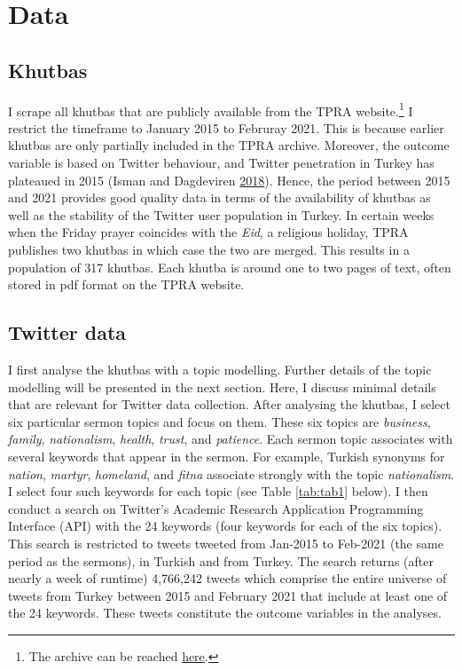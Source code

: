 \documentclass[
  12pt,
]{article}
\begin{document}
\hypertarget{data}{%
\section{Data}\label{data}}

\hypertarget{khutbas}{%
\subsection{Khutbas}\label{khutbas}}

I scrape all khutbas that are publicly available from the TPRA website.\footnote{The archive can be reached \href{https://dinhizmetleri.diyanet.gov.tr/kategoriler/yayinlarimiz/hutbeler/hutbe-ar\%C5\%9Fivi}{here}.} I restrict the timeframe to January 2015 to Februray 2021. This is because earlier khutbas are only partially included in the TPRA archive. Moreover, the outcome variable is based on Twitter behaviour, and Twitter penetration in Turkey has plateaued in 2015 (Isman and Dagdeviren \protect\hyperlink{ref-isman2018diffusion}{2018}). Hence, the period between 2015 and 2021 provides good quality data in terms of the availability of khutbas as well as the stability of the Twitter user population in Turkey. In certain weeks when the Friday prayer coincides with the \emph{Eid}, a religious holiday, TPRA publishes two khutbas in which case the two are merged. This results in a population of 317 khutbas. Each khutba is around one to two pages of text, often stored in pdf format on the TPRA website.

\hypertarget{twitter-data}{%
\subsection{Twitter data}\label{twitter-data}}

I first analyse the khutbas with a topic modelling. Further details of the topic modelling will be presented in the next section. Here, I discuss minimal details that are relevant for Twitter data collection. After analysing the khutbas, I select six particular sermon topics and focus on them. These six topics are \emph{business}, \emph{family}, \emph{nationalism}, \emph{health}, \emph{trust}, and \emph{patience}. Each sermon topic associates with several keywords that appear in the sermon. For example, Turkish synonyms for \emph{nation}, \emph{martyr}, \emph{homeland}, and \emph{fitna} associate strongly with the topic \emph{nationalism}. I select four such keywords for each topic (see Table \ref{tab:tab1} below). I then conduct a search on Twitter's Academic Research Application Programming Interface (API) with the 24 keywords (four keywords for each of the six topics). This search is restricted to tweets tweeted from Jan-2015 to Feb-2021 (the same period as the sermons), in Turkish and from Turkey. The search returns (after nearly a week of runtime) 4,766,242 tweets which comprise the entire universe of tweets from Turkey between 2015 and February 2021 that include at least one of the 24 keywords. These tweets constitute the outcome variables in the analyses.
\end{document}

